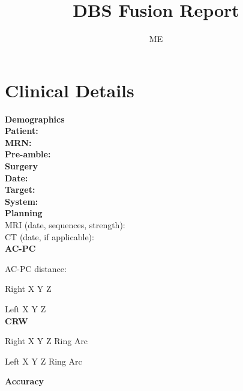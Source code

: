 \documentclass[12pt,fullpage]{article}
\title{DBS Fusion Report}
\author{ME}
\begin{document}
 
\maketitle %



\section{Clinical Details}

\textbf{Demographics}\\

\textbf{Patient:}\\

\textbf{MRN:}\\

\textbf{Pre-amble:}\\

\noindent \textbf{Surgery}\\

\textbf{Date:}\\
	
\textbf{Target:}\\

\textbf{System:}\\

\noindent \textbf{Planning}\\


MRI (date, sequences, strength): \\

CT (date, if applicable): \\

\textbf{AC-PC} 

AC-PC distance:

Right X Y Z

Left X Y Z \\

\textbf{CRW}

Right X Y Z Ring Arc

Left X Y Z Ring Arc

\pagebreak

\noindent \textbf{Accuracy}\\
\end{document}
